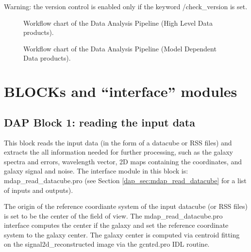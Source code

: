 \documentclass[11pt]{book}
\begin{document}
Warning: the version control is enabled only if the keyword
/check\_version is set.

\begin{figure}
\begin{center}
\caption{Workflow chart of the Data Analysis Pipeline (High Level Data products).}
 \label{dap_fig:dap_workflow_1}
\end{center}
\end{figure}


\begin{figure}
\begin{center}
\caption{Workflow chart of the Data Analysis Pipeline (Model Dependent Data products).}
 \label{dap_fig:dap_workflow_2}
\end{center}
\end{figure}

\chapter{BLOCKs and ``interface'' modules}
\label{dap_chap:blocks}

\section{DAP Block 1: reading the input data}
\label{dap_sec:block1}

This block reads the input data (in the form of a datacube or RSS
files) and extracts the all information needed for further processing,
such as the galaxy spectra and errors, wavelength vector, 2D maps
containing the coordinates, and galaxy signal and noise. The interface
module in this block is: mdap\_read\_datacube.pro (see Section
\ref{dap_sec:mdap_read_datacube} for a list of inputs and outputs).


The origin of the reference coordiante system of the input datacube
(or RSS files) is set to be the center of the field of view. The
mdap\_read\_datacube.pro interface computes the center if the galaxy
and set the reference coordinate system to the galaxy center. The
galaxy center is computed via centroid fitting on the
signal2d\_reconstructed image via the gcntrd.pro IDL routine.
\end{document}
